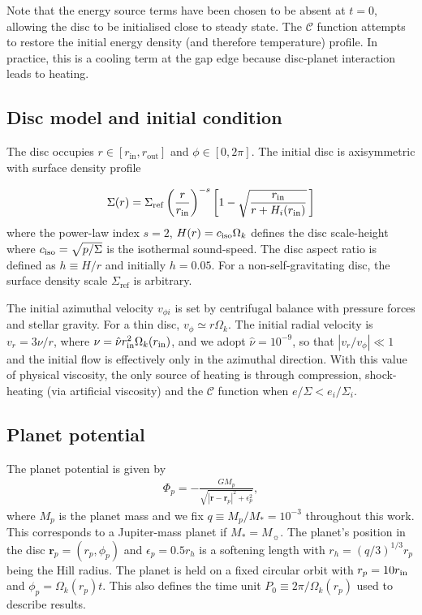 Note that the energy source terms
have been chosen to be absent at $t=0$, allowing the disc to be
initialised close to steady state. The $\mathcal{C}$ function attempts
to restore the initial energy density (and 
therefore temperature) profile. In practice, this is a cooling term at
the gap edge because disc-planet interaction leads to heating.  

\subsection{Disc model and initial condition}
The disc occupies $r\in[r_\mathrm{in}, r_\mathrm{out}]$ and
$\phi\in[0,2\pi]$. The initial disc is axisymmetric with  
surface density profile  
 
\begin{align}\label{initial_density}
   \Sigma(r) = \Sigma_\mathrm{ref}\left(\frac{r}{r_\mathrm{in}}\right)^{-s}
    \left[1 - \sqrt{\frac{r_\mathrm{in}}{r + H_i(r_\mathrm{in})}}\,\right] 
\end{align}
where the power-law index $s=2$, $H(r) = c_\mathrm{iso}\Omega_k $ defines the disc scale-height 
where $c_\mathrm{iso}=\sqrt{p/\Sigma}$ is the isothermal sound-speed. The disc aspect ratio is defined as $h\equiv H/r$ and initially
$h=0.05$. For a non-self-gravitating disc, the surface density scale
$\Sigma_\mathrm{ref}$ is arbitrary. 

The initial azimuthal velocity $v_{\phi i}$ is set by centrifugal balance with
pressure forces and stellar gravity. For a thin disc, 
$v_{\phi}\simeq r\Omega_k$. The initial radial velocity is
$v_{r}=3\nu/r$, where $\nu = \hat{\nu}r_\mathrm{in}^2\Omega_k(r_\mathrm{in})$, and we
adopt $\hat{\nu}= 10^{-9}$, so that $|v_{r}/v_{\phi}|\ll1$ and the initial 
flow is effectively only in the azimuthal direction.  With this value 
of physical viscosity, the only source of heating is through
compression, shock-heating (via artificial viscosity) and the
$\mathcal{C}$ function when $e/\Sigma<e_i/\Sigma_i$. 

\subsection{Planet potential}\label{planet_config}
The planet potential is given by 
\begin{align}
  \Phi_p = -\frac{GM_p}{\sqrt{|\bm{r} - \bm{r}_p|^2 + \epsilon_p^2}},
\end{align}
where $M_p$ is the planet mass and we fix $q\equiv M_p/M_*=10^{-3}$
throughout this work. This corresponds to a Jupiter-mass planet if $M_*=M_{\sun}$. 
The planet's position in the disc 
$\bm{r}_p=(r_p,\phi_p)$  and $\epsilon_p=0.5r_h$ is a softening
length with $r_h=(q/3)^{1/3}r_p$ being the Hill radius.  
The planet is held on a fixed circular orbit with $ r_p = 10r_\mathrm{in}$ and $\phi_p=\Omega_k(r_p)t$. 
This also
defines the time unit $P_0\equiv 2\pi/\Omega_k(r_p)$ used to describe results. 


